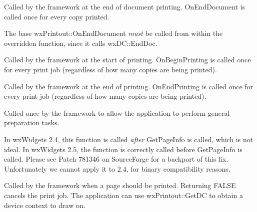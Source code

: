 \label{wxprintoutonenddocument}


Called by the framework at the end of document printing. OnEndDocument
is called once for every copy printed.

The base wxPrintout::OnEndDocument {\it must} be called
from within the overridden function, since it calls wxDC::EndDoc.

\label{wxprintoutonbeginprinting}


Called by the framework at the start of printing. OnBeginPrinting is called once for every
print job (regardless of how many copies are being printed).

\label{wxprintoutonendprinting}


Called by the framework at the end of printing. OnEndPrinting
is called once for every print job (regardless of how many copies are being printed).

\label{wxprintoutonprepareprinting}


Called once by the framework to allow the application to perform general
preparation tasks.

In wxWidgets 2.4, this function is called {\it after} GetPageInfo is called,
which is not ideal. In wxWidgets 2.5, the function is correctly called
before GetPageInfo is called. Please see Patch 781346 on SourceForge
for a backport of this fix. Unfortunately we cannot apply it to 2.4,
for binary compatibility reasons.

\label{wxprintoutonprintpage}


Called by the framework when a page should be printed. Returning FALSE cancels
the print job. The application can use wxPrintout::GetDC to obtain a device
context to draw on.

\section{}\label{wxprintpreview}

